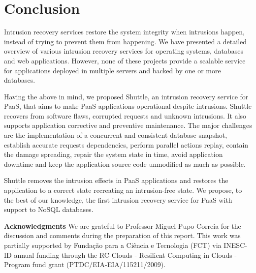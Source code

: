 \section{Conclusion}
\label{sec:Conclusion}

Intrusion recovery services restore the system integrity when intrusions happen, instead of trying to prevent them from happening. We have presented a detailed overview of various intrusion recovery services for operating systems, databases and web applications. However, none of these projects provide a scalable service for applications deployed in multiple servers and backed by one or more databases.

Having the above in mind, we proposed Shuttle, an intrusion recovery service for PaaS, that aims to make PaaS applications operational despite intrusions. Shuttle recovers from software flaws, corrupted requests and unknown intrusions. It also supports application corrective and preventive maintenance. The major challenges are the implementation of a concurrent and consistent database snapshot, establish accurate requests dependencies, perform parallel actions replay, contain the damage spreading, repair the system state in time, avoid application downtime and keep the application source code unmodified as much as possible.

Shuttle removes the intrusion effects in PaaS applications and restores the application to a correct state recreating an intrusion-free state. We propose, to the best of our knowledge, the first intrusion recovery service for PaaS with support to NoSQL databases.
 

\vspace{8mm}

\textbf{Acknowledgments} We are grateful to Professor Miguel Pupo Correia for the discussion and comments during the preparation of this report. This work was partially supported by Fundação para a Ciência e Tecnologia (FCT) via INESC-ID annual funding through the RC-Clouds - Resilient Computing in Clouds - Program fund grant (PTDC/EIA-EIA/115211/2009).